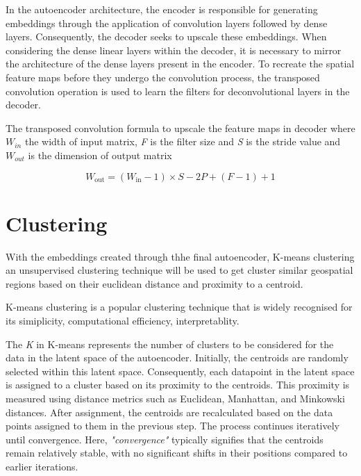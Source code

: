 \documentclass[a4paper,12pt]{Classes/RoboticsLaTeX}
\begin{document}
	 In the autoencoder architecture, the encoder is responsible for generating embeddings through the application of convolution 
	 layers followed by dense layers. Consequently, the decoder seeks to upscale these embeddings. When considering the dense linear 
	 layers within the decoder, it is necessary to mirror the architecture of the dense layers present in the encoder. To recreate the 
	 spatial feature maps before they undergo the convolution process, the transposed convolution operation is used to learn the filters 
	 for deconvolutional layers in the decoder.

	 The transposed convolution formula to upscale the feature maps in decoder where $\textit{W}_{in}$ the width of input matrix, \textit{F} is the filter size and \textit{S} is the stride value and
	 $\textit{W}_{out}$ is the dimension of output matrix

	 \[W_{\text{out}} = (W_{\text{in}} - 1) \times S - 2P + (F - 1) + 1\]

	


	\section{Clustering}

	With the embeddings created through thhe final autoencoder, K-means clustering an unsupervised 
	clustering technique will be used to get cluster similar geospatial regions based on their euclidean distance 
	and proximity to a centroid.

	K-means clustering is a popular clustering technique that is widely recognised for its simiplicity, computational 
	efficiency, interpretablity.

	The \textit{K} in K-means represents the number of clusters to be considered for the data in the latent space of the 
	autoencoder. Initially, the centroids are randomly selected within this latent space. Consequently, each datapoint in 
	the latent space is assigned to a cluster based on its proximity to the centroids. This proximity is measured using 
	distance metrics such as Euclidean, Manhattan, and Minkowski distances. After assignment, the centroids are recalculated 
	based on the data points assigned to them in the previous step. The process continues iteratively until convergence. Here,
	 \textit{"convergence"} typically signifies that the centroids remain relatively stable, with no significant shifts in their 
	 positions compared to earlier iterations.
\end{document}
